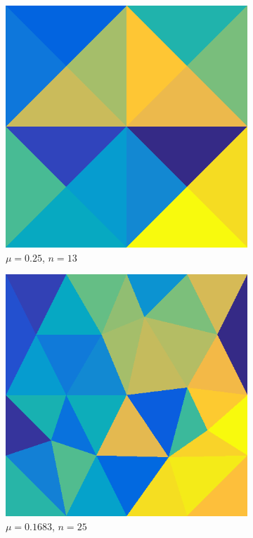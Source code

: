 \documentclass[../fem.tex]{subfile}
\begin{document}
\begin{figure}[htpb]
  \centering
  \begin{subfigure}{0.4\textwidth}
    \centering
    \includegraphics[width=0.8\linewidth]{figures/r1/tri.png}
    \caption{$\mu=0.25$, $n=13$}
  \end{subfigure}
  \begin{subfigure}{0.4\textwidth}
    \centering
    \includegraphics[width=0.8\linewidth]{figures/r2/tri.png}
    \caption{$\mu=0.1683$, $n=25$}
  \end{subfigure}
  \begin{subfigure}{0.4\textwidth}

\end{subfigure}
\end{figure}
\end{document}
